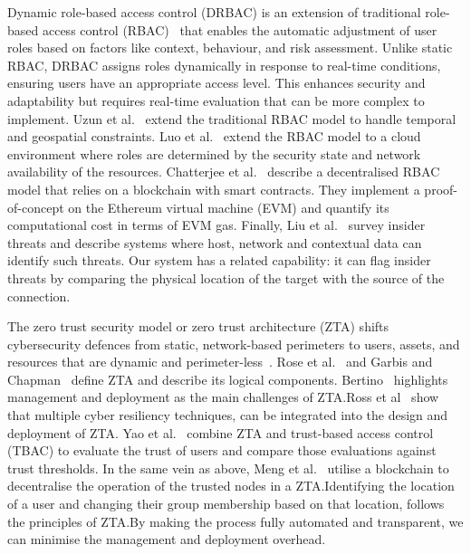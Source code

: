 Dynamic role-based access control (DRBAC) is an extension of
traditional role-based access control
(RBAC)~\cite{franqueira-wieringa-12} that enables the automatic
adjustment of user roles based on factors like context, behaviour, and
risk assessment.  Unlike static RBAC, DRBAC assigns roles dynamically
in response to real-time conditions, ensuring users have an
appropriate access level.  This enhances security and adaptability but
requires real-time evaluation that can be more complex to implement.
Uzun et al.~\cite{uzun-et-al-12} extend the traditional RBAC model to
handle temporal and geospatial constraints.  Luo et
al.~\cite{luo-et-al-16} extend the RBAC model to a cloud environment
where roles are determined by the security state and network
availability of the resources.  Chatterjee et
al.~\cite{chatterjee-et-al-20} describe a decentralised RBAC model
that relies on a blockchain with smart contracts.  They implement a
proof-of-concept on the Ethereum virtual machine (EVM) and quantify
its computational cost in terms of EVM gas.  Finally, Liu et
al.~\cite{liu-et-al-18} survey insider threats and describe systems
where host, network and contextual data can identify such threats.
Our system has a related capability: it can flag insider threats by
comparing the physical location of the target with the source of the
connection.

The zero trust security model or zero trust architecture (ZTA) shifts
cybersecurity defences from static, network-based perimeters to users,
assets, and resources that are dynamic and
perimeter-less~\cite{syed-et-al-22}.  Rose et al.~\cite{rose-et-al-20}
and Garbis and Chapman~\cite{garbis-chapman-21} define ZTA and
describe its logical components.  Bertino~\cite{bertino-21} highlights
management and deployment as the main challenges of ZTA.\@ Ross et
al~\cite{ross-et-al-21} show that multiple cyber resiliency
techniques, can be integrated into the design and deployment of ZTA.\@
Yao et al.~\cite{yao-et-al-21} combine ZTA and trust-based access
control (TBAC) to evaluate the trust of users and compare those
evaluations against trust thresholds.  In the same vein as above, Meng
et al.~\cite{meng-et-al-22} utilise a blockchain to decentralise the
operation of the trusted nodes in a ZTA.\@ Identifying the location of
a user and changing their group membership based on that location,
follows the principles of ZTA.\@ By making the process fully automated
and transparent, we can minimise the management and deployment
overhead.
